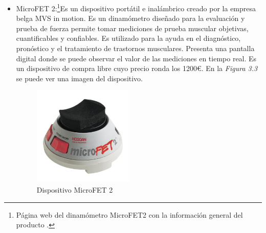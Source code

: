 \begin{itemize}
    \item MicroFET 2:\cite{microfet}\footnote{Página web del dinamómetro MicroFET2 con la información general del producto \cite{microfet}.}Es un dispositivo portátil e inalámbrico creado por la empresa belga MVS in motion. Es un dinamómetro diseñado para la evaluación y prueba de fuerza permite tomar mediciones de prueba muscular objetivas, cuantificables y confiables.
    Es utilizado para la ayuda en el diagnóstico, pronóstico y el tratamiento de trastornos musculares. Presenta una pantalla digital donde se puede observar el valor de las mediciones en tiempo real. 
    Es un dispositivo de compra libre cuyo precio ronda los 1200€. En la \textit{Figura 3.3} se puede ver una imagen del dispositivo.
    \begin{figure}[h]
        \centering
        \includegraphics[width=0.45\textwidth]{img/MicroFET 2.jpg}
        \caption{Dispositivo MicroFET 2}
        \label{fig:activforce}
    \end{figure}
    

\end{itemize}
